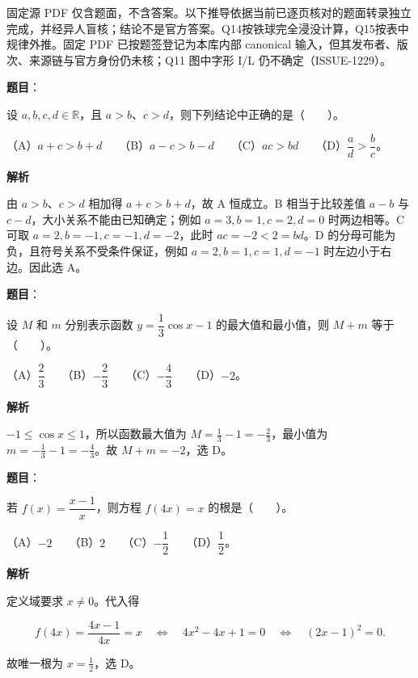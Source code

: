 

\begin{gktip}
固定源 PDF 仅含题面，不含答案。以下推导依据当前已逐页核对的题面转录独立完成，并经异人盲核；结论不是官方答案。Q14按铁球完全浸没计算，Q15按表中规律外推。固定 PDF 已按题签登记为本库内部 canonical 输入，但其发布者、版次、来源链与官方身份仍未核；Q11 图中字形 I/L 仍不确定（ISSUE-1229）。
\end{gktip}

\begin{answer}

\textbf{题目}：

设 $a,b,c,d\in\mathbb{R}$，且 $a>b$、$c>d$，则下列结论中正确的是\mbox{（　　）}。

（A）$a+c>b+d$　　（B）$a-c>b-d$　　（C）$ac>bd$　　（D）$\dfrac{a}{d}>\dfrac{b}{c}$。

\textbf{解析}

由 $a>b$、$c>d$ 相加得 $a+c>b+d$，故 A 恒成立。B 相当于比较差值 $a-b$ 与 $c-d$，大小关系不能由已知确定；例如 $a=3,b=1,c=2,d=0$ 时两边相等。C 可取 $a=2,b=-1,c=-1,d=-2$，此时 $ac=-2<2=bd$。D 的分母可能为负，且符号关系不受条件保证，例如 $a=2,b=1,c=1,d=-1$ 时左边小于右边。因此选 A。


\end{answer}
\begin{answer}

\textbf{题目}：

设 $M$ 和 $m$ 分别表示函数 $y=\dfrac13\cos x-1$ 的最大值和最小值，则 $M+m$ 等于\mbox{（　　）}。

（A）$\dfrac23$　　（B）$-\dfrac23$　　（C）$-\dfrac43$　　（D）$-2$。

\textbf{解析}

$-1\leqslant\cos x\leqslant1$，所以函数最大值为 $M=\frac13-1=-\frac23$，最小值为 $m=-\frac13-1=-\frac43$。故 $M+m=-2$，选 D。


\end{answer}
\begin{answer}

\textbf{题目}：

若 $f(x)=\dfrac{x-1}{x}$，则方程 $f(4x)=x$ 的根是\mbox{（　　）}。

（A）$-2$　　（B）$2$　　（C）$-\dfrac12$　　（D）$\dfrac12$。

\textbf{解析}

定义域要求 $x\ne0$。代入得

\nopagebreak[4]
\[
f(4x)=\frac{4x-1}{4x}=x
\quad\Longleftrightarrow\quad
4x^2-4x+1=0
\quad\Longleftrightarrow\quad
(2x-1)^2=0.
\]

故唯一根为 $x=\frac12$，选 D。


\end{answer}
